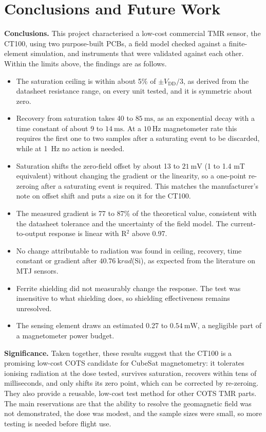 \documentclass[12pt,a4paper]{article}
\begin{document}
\section{Conclusions and Future Work}
\label{sec:conclusions}

\textbf{Conclusions.} This project characterised a low-cost commercial TMR sensor, the CT100, using two purpose-built PCBs, a field model checked against a finite-element simulation, and instruments that were validated against each other. Within the limits above, the findings are as follows.
\begin{itemize}
\item The saturation ceiling is within about 5\% of $\pm V_{\text{DD}}/3$, as derived from the datasheet resistance range, on every unit tested, and it is symmetric about zero.
\item Recovery from saturation takes 40 to $\SI{85}{\milli\second}$, as an exponential decay with a time constant of about 9 to $\SI{14}{\milli\second}$. At a $\SI{10}{\hertz}$ magnetometer rate this requires the first one to two samples after a saturating event to be discarded, while at \SI{1}{\hertz} no action is needed.
\item Saturation shifts the zero-field offset by about 13 to $\SI{21}{\milli\volt}$ (1 to 1.4 mT equivalent) without changing the gradient or the linearity, so a one-point re-zeroing after a saturating event is required. This matches the manufacturer's note on offset shift and puts a size on it for the CT100.
\item The measured gradient is 77 to 87\% of the theoretical value, consistent with the datasheet tolerance and the uncertainty of the field model. The current-to-output response is linear with R$^2$ above 0.97.
\item No change attributable to radiation was found in ceiling, recovery, time constant or gradient after $\SI{40.76}{\kilo rad}$(Si), as expected from the literature on MTJ sensors.
\item Ferrite shielding did not measurably change the response. The test was insensitive to what shielding does, so shielding effectiveness remains unresolved.
\item The sensing element draws an estimated 0.27 to $\SI{0.54}{\milli\watt}$, a negligible part of a magnetometer power budget.
\end{itemize}

\textbf{Significance.} Taken together, these results suggest that the CT100 is a promising low-cost COTS candidate for CubeSat magnetometry: it tolerates ionising radiation at the dose tested, survives saturation, recovers within tens of milliseconds, and only shifts its zero point, which can be corrected by re-zeroing. They also provide a reusable, low-cost test method for other COTS TMR parts. The main reservations are that the ability to resolve the geomagnetic field was not demonstrated, the dose was modest, and the sample sizes were small, so more testing is needed before flight use.
\end{document}
